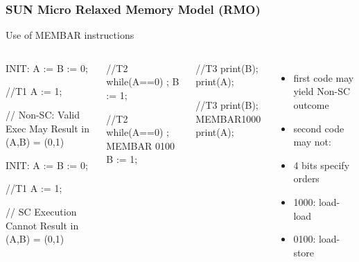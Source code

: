 \documentclass{beamer}
\renewcommand{\emph}[1]{\textcolor{structure}{#1}}
\begin{document}
\begin{frame}[fragile,t]
\frametitle{SUN Micro Relaxed Memory Model (RMO)}

\begin{block}{Use of MEMBAR instructions}
\begin{columns}
\begin{colorcode}[fontsize=\scriptsize]
            INIT: A := B := 0; 

//T1
A := 1;

\alert{// Non-SC: Valid Exec May Result in (A,B) = (0,1)}


            INIT: A := B := 0; 

//T1
A := 1;


\emph{// SC Execution Cannot Result in (A,B) = (0,1)}
\end{colorcode} 
\begin{colorcode}[fontsize=\scriptsize]

//T2
while(A==0) ;
B := 1;





//T2
while(A==0) ;
MEMBAR 0100
B := 1;

\end{colorcode} 
\begin{colorcode}[fontsize=\scriptsize]

//T3
print(B);
print(A);





//T3
print(B);
MEMBAR1000
print(A);

\end{colorcode} 
\begin{itemize}
    \item first code may yield Non-SC outcome\bigskip
    \item second code may not:
    \item 4 bits specify orders\smallskip
    \item 1000: load-load
    \item 0100: load-store
\end  {itemize}
\end{columns}
\end{block}
\end{frame}
\end{document}
